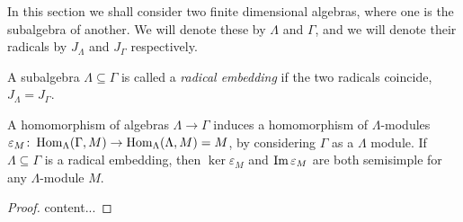\cite{EHIS04}

In this section we shall consider two finite dimensional algebras, where one is the subalgebra of another. We will denote these by $\Lambda$ and $\Gamma$, and we will denote their radicals by $J_\Lambda$ and $J_\Gamma$ respectively.

\begin{defn}
	A subalgebra $\Lambda \subseteq \Gamma$ is called a \emph{radical embedding} if the two radicals coincide, $J_\Lambda = J_\Gamma$.
\end{defn}

\begin{lemma}\cite[Lemma~2.3]{EHIS04}\label{lem:epsilon_semisimple_(co)kernel}
	A homomorphism of algebras $\Lambda \to \Gamma$ induces a homomorphism of $\Lambda$-modules $\varepsilon_M\colon \operatorname{Hom}_\Lambda(\Gamma, M) \to \operatorname{Hom}_\Lambda(\Lambda, M)=M$, by considering $\Gamma$ as a $\Lambda$ module. If $\Lambda \subseteq \Gamma$ is a radical embedding, then $\ker \varepsilon_M$ and $\operatorname{Im} \varepsilon_M$ are both semisimple for any $\Lambda$-module $M$.
	\begin{proof}
		content...
	\end{proof}
\end{lemma}

